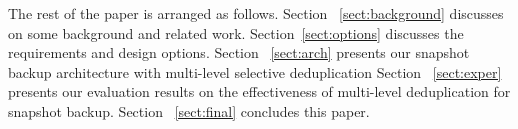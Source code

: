 
The rest of the paper is arranged as follows. 
Section ~\ref{sect:background}
discusses on some background and related work.
Section~\ref{sect:options} discusses the requirements and  design options.
Section ~\ref{sect:arch} presents our snapshot backup architecture with multi-level selective deduplication 
Section ~\ref{sect:exper} presents  our evaluation results on the effectiveness
of multi-level deduplication for snapshot backup. 
Section ~\ref{sect:final} concludes this paper.
